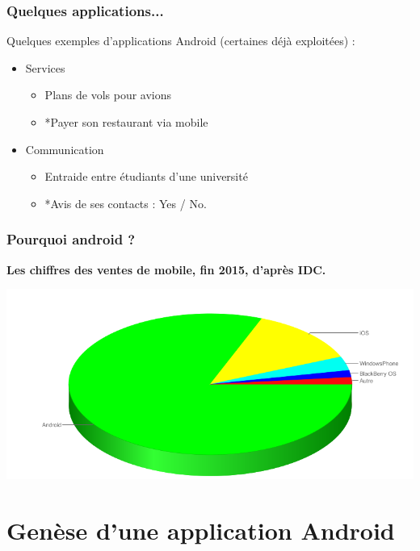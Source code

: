 \documentclass{beamer}
\begin{document}
\begin{frame}
\frametitle{Quelques applications...}

\begin{block}{Quelques exemples d'applications Android (certaines déjà exploitées) :}

\begin{itemize}
\item Services
    \begin{itemize}
	\item Plans de vols pour avions
	\item *Payer son restaurant via mobile
	\end{itemize}
\item Communication
	\begin{itemize}
	\item Entraide entre étudiants d'une université
	\item *Avis de ses contacts : Yes / No.
	\end{itemize}
\end{itemize}

\end{block}

\end{frame}

\begin{frame}
\frametitle{Pourquoi android ?}

\textbf{Les chiffres des ventes de mobile, fin 2015, d'après IDC.}

\begin{center}
\includegraphics[scale=0.3]{marche-os-2015.png}
\end{center}

\end{frame}

\section{Genèse d'une application Android}
\end{document}
